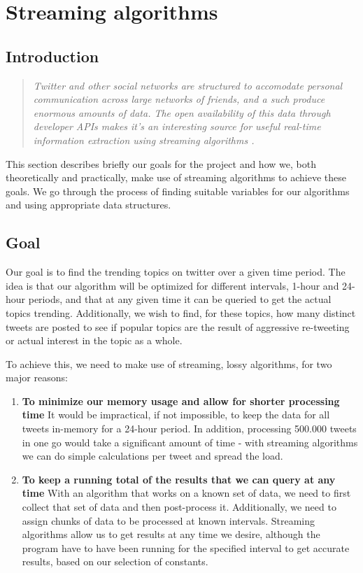 \section{Streaming algorithms}\label{related work}
\subsection{Introduction}\label{algo-intro}
\begin{quote}\textit{
Twitter and other social networks are structured to accomodate personal communication across large networks of friends, and a such produce enormous amounts of data. The open availability of this data through developer APIs makes it's an interesting source for useful real-time information extraction using streaming algorithms \cite{genderprediction}. 
}
\end{quote}

This section describes briefly our goals for the project and how we, both theoretically and practically, make use of streaming algorithms to achieve these goals. We go through the process of finding suitable variables for our algorithms and using appropriate data structures.

\subsection{Goal}\label{algo-goals}
Our goal is to find the trending topics on twitter over a given time period. The idea is that our algorithm will be optimized for different intervals, 1-hour and 24-hour periods, and that at any given time it can be queried to get the actual topics trending. Additionally, we wish to find, for these topics, how many distinct tweets are posted to see if popular topics are the result of aggressive re-tweeting or actual interest in the topic as a whole.

To achieve this, we need to make use of streaming, lossy algorithms, for two major reasons:
\begin{enumerate}
    \item \textbf{To minimize our memory usage and allow for shorter processing time}
        It would be impractical, if not impossible, to keep the data for all tweets in-memory for a 24-hour period. In addition, processing 500.000 tweets in one go would take a significant amount of time - with streaming algorithms we can do simple calculations per tweet and spread the load.

    \item \textbf{To keep a running total of the results that we can query at any time}
        With an algorithm that works on a known set of data, we need to first collect that set of data and then post-process it. Additionally, we need to assign chunks of data to be processed at known intervals. Streaming algorithms allow us to get results at any time we desire, although the program have to have been running for the specified interval to get accurate results, based on our selection of constants.
\end{enumerate}

